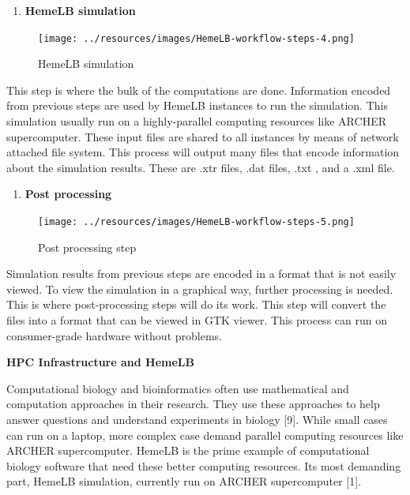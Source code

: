 \documentclass[]{article}
\providecommand{\tightlist}{%
  \setlength{\itemsep}{0pt}\setlength{\parskip}{0pt}}
\begin{document}
\begin{enumerate}
\def\labelenumi{\arabic{enumi}.}
\setcounter{enumi}{3}
\tightlist
\item
  \textbf{HemeLB simulation}
\end{enumerate}

\begin{figure}[H]
\centering
\texttt{[image: ../resources/images/HemeLB-workflow-steps-4.png]}
\caption{HemeLB simulation}
\end{figure}

This step is where the bulk of the computations are done. Information
encoded from previous steps are used by HemeLB instances to run the
simulation. This simulation usually run on a highly-parallel computing
resources like ARCHER supercomputer. These input files are shared to all
instances by means of network attached file system. This process will
output many files that encode information about the simulation results.
These are .xtr files, .dat files, .txt , and a .xml file.

\begin{enumerate}
\def\labelenumi{\arabic{enumi}.}
\setcounter{enumi}{4}
\tightlist
\item
  \textbf{Post processing}
\end{enumerate}

\begin{figure}[H]
\centering
\texttt{[image: ../resources/images/HemeLB-workflow-steps-5.png]}
\caption{Post processing step}
\end{figure}

Simulation results from previous steps are encoded in a format that is
not easily viewed. To view the simulation in a graphical way, further
processing is needed. This is where post-processing steps will do its
work. This step will convert the files into a format that can be viewed
in GTK viewer. This process can run on consumer-grade hardware without
problems.

\textbf{HPC Infrastructure and HemeLB}

Computational biology and bioinformatics often use mathematical and
computation approaches in their research. They use these approaches to
help answer questions and understand experiments in biology {[}9{]}.
While small cases can run on a laptop, more complex case demand parallel
computing resources like ARCHER supercomputer. HemeLB is the prime
example of computational biology software that need these better
computing resources. Its most demanding part, HemeLB simulation,
currently run on ARCHER supercomputer {[}1{]}.
\end{document}
